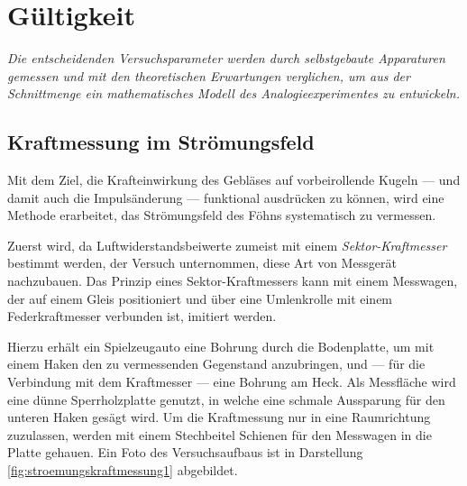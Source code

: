 \chapter{Gültigkeit}
\label{kap:5}

\textit{Die entscheidenden Versuchsparameter werden durch selbstgebaute Apparaturen gemessen und mit den theoretischen Erwartungen verglichen, um aus der Schnittmenge ein mathematisches Modell des Analogieexperimentes zu entwickeln.}

\section{Kraftmessung im Strömungsfeld}

Mit dem Ziel, die Krafteinwirkung des Gebläses auf vorbeirollende Kugeln --- und damit auch die Impulsänderung --- funktional ausdrücken zu können, wird eine Methode erarbeitet, das Strömungsfeld des Föhns systematisch zu vermessen.

Zuerst wird, da Luftwiderstandsbeiwerte zumeist mit einem \textit{Sektor-Kraftmesser} bestimmt werden, der Versuch unternommen, diese Art von Messgerät nachzubauen. Das Prinzip eines Sektor-Kraftmessers kann mit einem Messwagen, der auf einem Gleis positioniert und über eine Umlenkrolle mit einem Federkraftmesser verbunden ist, imitiert werden.



\noindent Hierzu erhält ein Spielzeugauto eine Bohrung durch die Bodenplatte, um mit einem Haken den zu vermessenden Gegenstand anzubringen, und --- für die Verbindung mit dem Kraftmesser --- eine Bohrung am Heck. Als Messfläche wird eine dünne Sperrholzplatte genutzt, in welche eine schmale Aussparung für den unteren Haken gesägt wird. Um die Kraftmessung nur in eine Raumrichtung zuzulassen, werden mit einem Stechbeitel Schienen für den Messwagen in die Platte gehauen. Ein Foto des Versuchsaufbaus ist in Darstellung \ref{fig:stroemungskraftmessung1} abgebildet.

